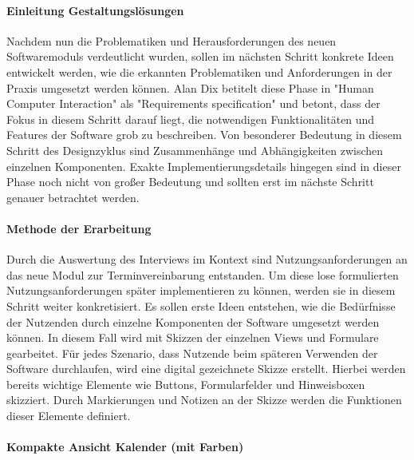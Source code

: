 \paragraph{Einleitung Gestaltungslösungen}
Nachdem nun die Problematiken und Herausforderungen des neuen Softwaremoduls
verdeutlicht wurden, sollen im nächsten Schritt konkrete Ideen entwickelt
werden, wie die erkannten Problematiken und Anforderungen in der Praxis
umgesetzt werden können. Alan Dix betitelt diese Phase in "Human Computer
Interaction" als "Requirements specification" und betont, dass der Fokus in
diesem Schritt darauf liegt, die notwendigen Funktionalitäten und Features der
Software grob zu beschreiben. Von besonderer Bedeutung in diesem Schritt des
Designzyklus sind Zusammenhänge und Abhängigkeiten zwischen einzelnen
Komponenten. Exakte Implementierungsdetails hingegen sind in dieser Phase noch
nicht von großer Bedeutung und sollten erst im nächste Schritt genauer
betrachtet werden.

\paragraph{Methode der Erarbeitung}
Durch die Auswertung des Interviews im Kontext sind Nutzungsanforderungen an
das neue Modul zur Terminvereinbarung entstanden. Um diese lose formulierten
Nutzungsanforderungen später implementieren zu können, werden sie in diesem
Schritt weiter konkretisiert. Es sollen erste Ideen entstehen, wie die
Bedürfnisse der Nutzenden durch einzelne Komponenten der Software umgesetzt
werden können. In diesem Fall wird mit Skizzen der einzelnen Views und
Formulare gearbeitet. Für jedes Szenario, dass Nutzende beim späteren Verwenden
der Software durchlaufen, wird eine digital gezeichnete Skizze erstellt.
Hierbei werden bereits wichtige Elemente wie Buttons, Formularfelder und
Hinweisboxen skizziert. Durch Markierungen und Notizen an der Skizze werden die
Funktionen dieser Elemente definiert.

\paragraph{Kompakte Ansicht Kalender (mit Farben)}

